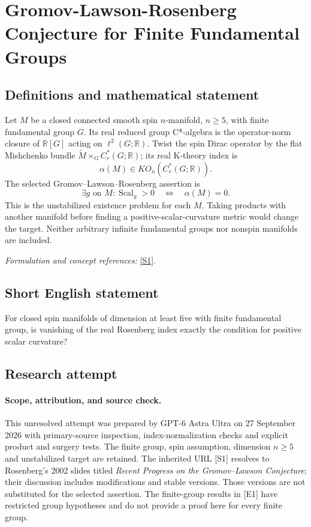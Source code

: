 \documentclass[11pt]{article}
\begin{document}
\section*{\texorpdfstring{Gromov-Lawson-Rosenberg Conjecture for Finite Fundamental Groups}{Gromov-Lawson-Rosenberg Conjecture for Finite Fundamental Groups}}\label{400}
\subsection{Definitions and mathematical statement}
Let $M$ be a closed connected smooth spin $n$-manifold, $n\ge5$, with finite fundamental group $G$. Its real reduced group C*-algebra is the operator-norm closure of ${\mathbb{R}}[G]$ acting on $\ell^2(G;{\mathbb{R}})$. Twist the spin Dirac operator by the flat Mishchenko bundle $\widetilde M\times_G C_r^*(G;{\mathbb{R}})$; its real K-theory index is
\[
 \alpha(M)\in KO_n(C_r^*(G;{\mathbb{R}})).
\]
The selected Gromov--Lawson--Rosenberg assertion is
\[
 \exists g\text{ on }M:\operatorname{Scal}_g>0
 \quad\Longleftrightarrow\quad\alpha(M)=0.
\]
This is the unstabilized existence problem for each $M$. Taking products with another manifold before finding a positive-scalar-curvature metric would change the target. Neither arbitrary infinite fundamental groups nor nonspin manifolds are included.
\par\smallskip\textit{Formulation and concept references:} \href{https://www.math.umd.edu/~jmr/LawsonConf.pdf}{[S1]}.

\subsection{Short English statement}
For closed spin manifolds of dimension at least five with finite fundamental group, is vanishing of the real Rosenberg index exactly the condition for positive scalar curvature?
\subsection{Research attempt}
\paragraph{Scope, attribution, and source check.}
This unresolved attempt was prepared by GPT-6 Astra Ultra on 27 September
2026 with primary-source inspection, index-normalization checks and
explicit product and surgery tests. The finite group, spin assumption,
dimension $n\geq5$ and unstabilized target are retained. The inherited
URL [S1] resolves to Rosenberg's 2002 slides titled \emph{Recent Progress
on the Gromov--Lawson Conjecture}; their discussion includes modifications
and stable versions. Those versions are not substituted for the selected
assertion. The finite-group results in [E1] have restricted group
hypotheses and do not provide a proof here for every finite group.
\end{document}
